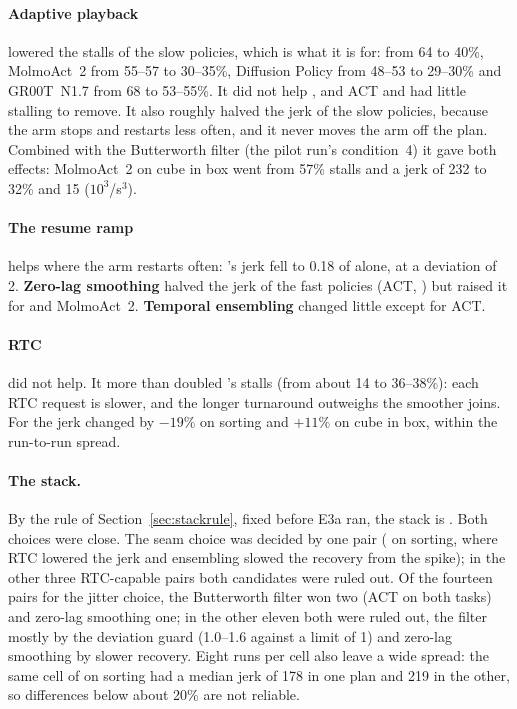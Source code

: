 \paragraph{Adaptive playback} lowered the stalls of the slow policies, which is what it is for: \groot{} from 64 to
40\%, MolmoAct~2 from 55--57 to 30--35\%, Diffusion Policy from 48--53 to 29--30\% and GR00T~N1.7 from 68 to
53--55\%. It did not help \pizerofive, and ACT and \smolvla{} had little stalling to remove. It also roughly halved
the jerk of the slow policies, because the arm stops and restarts less often, and it never moves the arm off the plan.
Combined with the Butterworth filter (the pilot run's condition~4) it gave both effects: MolmoAct~2 on cube in box went
from 57\% stalls and a jerk of 232 to 32\% and 15 ($10^3$\degree/s$^3$).

\paragraph{The resume ramp} helps where the arm restarts often: \groot's jerk fell to 0.18 of \drtc{} alone, at a
deviation of 2\degree. \textbf{Zero-lag smoothing} halved the jerk of the fast policies (ACT, \smolvla) but raised it
for \groot{} and MolmoAct~2. \textbf{Temporal ensembling} changed little except for ACT.

\paragraph{RTC} did not help. It more than doubled \smolvla's stalls (from about 14 to 36--38\%): each RTC request
is slower, and the longer turnaround outweighs the smoother joins. For \groot{} the jerk changed by $-19\%$ on sorting
and $+11\%$ on cube in box, within the run-to-run spread.

\paragraph{The stack.} By the rule of Section~\ref{sec:stackrule}, fixed before E3a ran, the stack is .
Both choices were close. The seam choice was decided by one pair (\groot{} on sorting, where RTC lowered the jerk and
ensembling slowed the recovery from the spike); in the other three RTC-capable pairs both candidates were ruled out.
Of the fourteen pairs for the jitter choice, the Butterworth filter won two (ACT on both tasks) and zero-lag smoothing
one; in the other eleven both were ruled out, the filter mostly by the deviation guard (1.0--1.6\degree{} against a
limit of 1\degree) and zero-lag smoothing by slower recovery. Eight runs per cell also leave a wide spread: the same
\drtc{} cell of \groot{} on sorting had a median jerk of 178 in one plan and 219 in the other, so differences below
about 20\% are not reliable.

